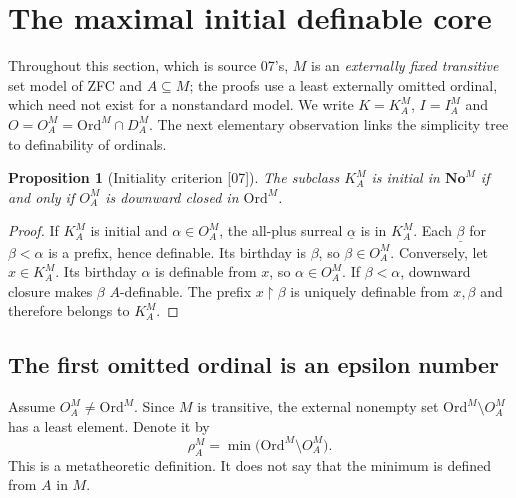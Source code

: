 \documentclass[11pt,a4paper]{article}
\numberwithin{equation}{section}
\newtheorem{proposition}[proposition]{Proposition}
\theoremstyle{definition}
\theoremstyle{remark}
\newcommand{\No}{\mathbf{No}}
\newcommand{\Ord}{\mathrm{Ord}}
\newcommand{\res}{\mathbin{\upharpoonright}}
\newcommand{\src}[1]{\textup{\textsf{\small[#1]}}}
\begin{document}
\section{The maximal initial definable core}
\label{dsn:sec:core}

Throughout this section, which is source 07's, $M$ is an \emph{externally
fixed transitive} set model of ZFC and $A\subseteq M$; the proofs use a
least externally omitted ordinal, which need not exist for a nonstandard
model. We write $K=K^M_A$, $I=I^M_A$ and $O=O^M_A=\Ord^M\cap D^M_A$. The
next elementary observation links the simplicity tree to definability of
ordinals.

\begin{proposition}[Initiality criterion \src{07}]\label{dsn:prop:initiality}
The subclass $K^M_A$ is initial in $\No^M$ if and only if $O^M_A$ is
downward closed in $\Ord^M$.
\end{proposition}
\begin{proof}
If $K^M_A$ is initial and $\alpha\in O^M_A$, the all-plus surreal
$\underline\alpha$ is in $K^M_A$. Each $\underline\beta$ for $\beta<\alpha$
is a prefix, hence definable. Its birthday is $\beta$, so $\beta\in O^M_A$.
Conversely, let $x\in K^M_A$. Its birthday $\alpha$ is definable from $x$,
so $\alpha\in O^M_A$. If $\beta<\alpha$, downward closure makes $\beta$
$A$-definable. The prefix $x\res\beta$ is uniquely definable from
$x,\beta$ and therefore belongs to $K^M_A$.
\end{proof}

\subsection{The first omitted ordinal is an epsilon number}

Assume $O^M_A\ne\Ord^M$. Since $M$ is transitive, the external nonempty set
$\Ord^M\setminus O^M_A$ has a least element. Denote it by
\begin{equation}\label{dsn:eq:rho}
 \rho^M_A=\min\bigl(\Ord^M\setminus O^M_A\bigr).
\end{equation}
This is a metatheoretic definition. It does not say that the minimum is
defined from $A$ in $M$.
\end{document}
